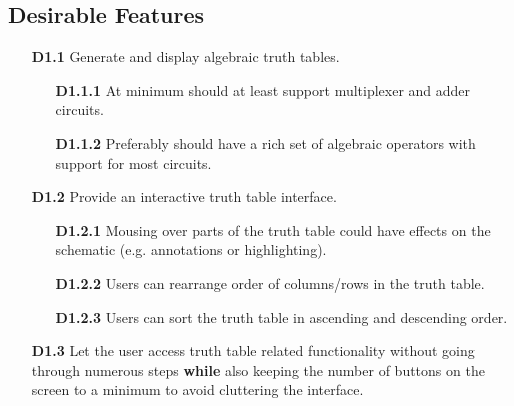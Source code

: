 \subsection*{Desirable Features}
\begin{itemize}
    \item[\textbf{D1.1}] Generate and display algebraic truth tables.
    \begin{itemize}
        \item[\textbf{D1.1.1}] At minimum should at least support multiplexer and adder circuits.
        \item[\textbf{D1.1.2}] Preferably should have a rich set of algebraic operators with support for most circuits.
    \end{itemize}
    \medskip
    \item[\textbf{D1.2}] Provide an interactive truth table interface.
    \begin{itemize}
        \item[\textbf{D1.2.1}] Mousing over parts of the truth table could have effects on the schematic (e.g. annotations or highlighting).
        \item[\textbf{D1.2.2}] Users can rearrange order of columns/rows in the truth table.
        \item[\textbf{D1.2.3}] Users can sort the truth table in ascending and descending order.
    \end{itemize}
    \medskip
    \item[\textbf{D1.3}] Let the user access truth table related functionality without going through numerous steps \textbf{while} also keeping the number of buttons on the screen to a minimum to avoid cluttering the interface. 
    \medskip
\end{itemize}


